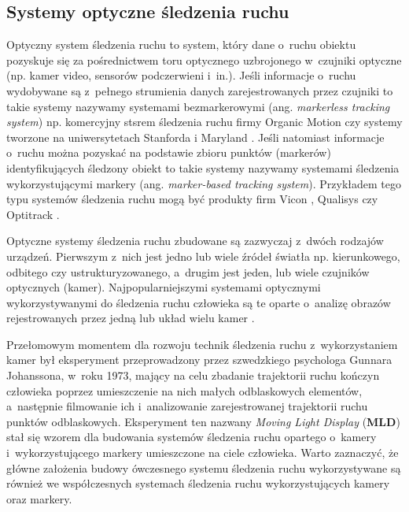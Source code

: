 \subsection{Systemy optyczne śledzenia ruchu}
Optyczny system śledzenia ruchu to system, który dane o~ruchu obiektu pozyskuje się za pośrednictwem toru optycznego uzbrojonego w~czujniki optyczne (np. kamer video, sensorów podczerwieni i~in.). Jeśli informacje o~ruchu wydobywane są z~pełnego strumienia danych zarejestrowanych przez czujniki to takie systemy nazywamy systemami bezmarkerowymi (ang. \textsl{markerless tracking system}) np. komercyjny stsrem śledzenia ruchu firmy Organic Motion \cite{OrganicmoitonWebsite} czy systemy tworzone na uniwersytetach Stanforda \cite{StanfordBiomotion} i Maryland \cite{Sundaresan2005,Sundaresan2007}. Jeśli natomiast informacje o~ruchu można pozyskać na podstawie zbioru punktów (markerów) identyfikujących śledzony obiekt to takie systemy nazywamy systemami śledzenia wykorzystującymi markery (ang. \textsl{marker-based tracking system}). Przykładem tego typu systemów śledzenia  ruchu mogą być produkty firm Vicon \cite{ViconWebsite}, Qualisys \cite{QulisysWebsite} czy Optitrack \cite{OptitrackWebsite}.

Optyczne systemy śledzenia ruchu zbudowane są zazwyczaj z~dwóch rodzajów urządzeń. Pierwszym z~nich jest jedno lub wiele źródeł światła np. kierunkowego, odbitego czy ustrukturyzowanego, a~drugim jest jeden, lub wiele czujników optycznych (kamer). Najpopularniejszymi systemami optycznymi wykorzystywanymi do śledzenia ruchu człowieka są te oparte o~analizę obrazów rejestrowanych przez jedną \cite{schmidt2006kernel,RuiLi2006} lub układ wielu kamer \cite{Sundaresan2005,ViconWebsite,QulisysWebsite}. 

Przełomowym momentem dla rozwoju technik śledzenia ruchu z~wykorzystaniem kamer był eksperyment przeprowadzony przez szwedzkiego psychologa Gunnara Johanssona, w~roku 1973, mający na celu zbadanie trajektorii ruchu kończyn człowieka poprzez umieszczenie na nich małych odblaskowych elementów, a~następnie filmowanie ich i~analizowanie zarejestrowanej trajektorii ruchu punktów odblaskowych. Eksperyment ten nazwany \emph{Moving Light Display} (\textbf{MLD}) \cite{Johansson1973} stał się wzorem dla budowania systemów śledzenia ruchu opartego o~kamery i~wykorzystującego markery umieszczone na ciele człowieka. Warto zaznaczyć, że główne założenia budowy ówczesnego systemu śledzenia ruchu wykorzystywane są również we współczesnych systemach śledzenia ruchu wykorzystujących kamery oraz markery.


